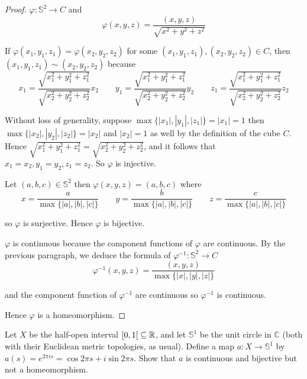 \begin{proof}
	$\varphi: \mathbb{S}^{2}\to C$ and
	\[
		\varphi(x, y, z) = \frac{(x, y, z)}{\sqrt{x^{2} + y^{2} + z^{2}}}
	\]

	If $\varphi(x_{1}, y_{1}, z_{1}) = \varphi(x_{2}, y_{2}, z_{2})$ for some $(x_{1}, y_{1}, z_{1}), (x_{2}, y_{2}, z_{2})\in C$, then $(x_{1}, y_{1}, z_{1}) \sim (x_{2}, y_{2}, z_{2})$ because
	\[
		x_{1} = \frac{\sqrt{x_{1}^{2} + y_{1}^{2} + z_{1}^{2}}}{\sqrt{x_{2}^{2} + y_{2}^{2} + z_{2}^{2}}}x_{2}\qquad y_{1} = \frac{\sqrt{x_{1}^{2} + y_{1}^{2} + z_{1}^{2}}}{\sqrt{x_{2}^{2} + y_{2}^{2} + z_{2}^{2}}}y_{2} \qquad z_{1} = \frac{\sqrt{x_{1}^{2} + y_{1}^{2} + z_{1}^{2}}}{\sqrt{x_{2}^{2} + y_{2}^{2} + z_{2}^{2}}}z_{2}
	\]

	Without loss of generality, suppose $\max\{ \left\vert{x_{1}}\right\vert, \left\vert{y_{1}}\right\vert, \left\vert{z_{1}}\right\vert \} = \left\vert{x_{1}}\right\vert = 1$ then $\max\{ \left\vert{x_{2}}\right\vert, \left\vert{y_{2}}\right\vert, \left\vert{z_{2}}\right\vert \} = \left\vert{x_{2}}\right\vert$ and $\left\vert{x_{2}}\right\vert = 1$ as well by the definition of the cube $C$. Hence $\sqrt{x_{1}^{2} + y_{1}^{2} + z_{1}^{2}} = \sqrt{x_{2}^{2} + y_{2}^{2} + z_{2}^{2}}$, and it follows that $x_{1} = x_{2}, y_{1} = y_{2}, z_{1} = z_{2}$. So $\varphi$ is injective.

	Let $(a, b, c)\in \mathbb{S}^{2}$ then $\varphi(x, y, z) = (a, b, c)$ where
	\[
		x = \frac{a}{\max\{ \left\vert{a}\right\vert, \left\vert{b}\right\vert, \left\vert{c}\right\vert \}}\qquad y = \frac{b}{\max\{ \left\vert{a}\right\vert, \left\vert{b}\right\vert, \left\vert{c}\right\vert \}}\qquad z = \frac{c}{\max\{ \left\vert{a}\right\vert, \left\vert{b}\right\vert, \left\vert{c}\right\vert \}}
	\]

	so $\varphi$ is surjective. Hence $\varphi$ is bijective.

	$\varphi$ is continuous because the component functions of $\varphi$ are continuous. By the previous paragraph, we deduce the formula of $\varphi^{-1}: \mathbb{S}^{2}\to C$
	\[
		\varphi^{-1}(x, y, z) = \frac{(x, y, z)}{\max\{ \left\vert{x}\right\vert, \left\vert{y}\right\vert, \left\vert{z}\right\vert \}}
	\]

	and the component function of $\varphi^{-1}$ are continuous so $\varphi^{-1}$ is continuous.

	Hence $\varphi$ is a homeomorphism.
\end{proof}

\begin{exercise}{2.28}
	Let $X$ be the half-open interval $\left[{0,1}\right[\subseteq\mathbb{R}$, and let $\mathbb{S}^{1}$ be the unit circle in $\mathbb{C}$ (both with their Euclidean metric topologies, as usual). Define a map $a: X\to \mathbb{S}^{1}$ by $a(s) = e^{2{\pi}is} = \cos 2\pi s + i\sin 2\pi s$. Show that $a$ is continuous and bijective but not a homeomorphism.
\end{exercise}

